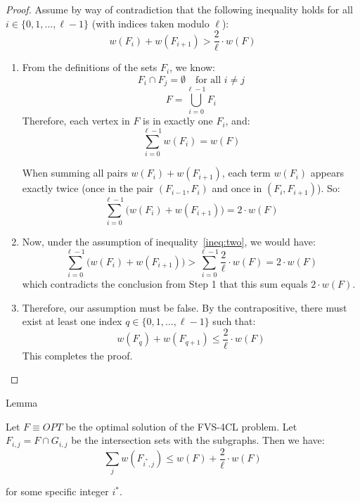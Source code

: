 \begin{proof}
Assume by way of contradiction that the following inequality holds for all \( i \in \{0, 1, \dots, \ell - 1\} \) (with indices taken modulo \( \ell \)):
\begin{equation}
    w(F_i) + w(F_{i+1}) > \frac{2}{\ell} \cdot w(F)
    \label{ineq:two}
\end{equation}

\begin{enumerate}
    \item From the definitions of the sets \( F_i \), we know:
    \[F_i \cap F_j = \emptyset \quad \text{for all } i \neq j\]
    \[F = \bigcup_{i = 0}^{\ell - 1} F_i\]
    Therefore, each vertex in \( F \) is in exactly one \( F_i \), and:
    \[
        \sum_{i=0}^{\ell - 1} w(F_i) = w(F)
    \]

    When summing all pairs \( w(F_i) + w(F_{i+1}) \), each term \( w(F_i) \) appears exactly twice (once in the pair \( (F_{i-1}, F_i) \) and once in \( (F_i, F_{i+1}) \)). So:
    \[
        \sum_{i=0}^{\ell - 1} \bigl( w(F_i) + w(F_{i+1}) \bigr) = 2 \cdot w(F)
    \]

    \item Now, under the assumption of inequality~\eqref{ineq:two}, we would have:
    \[
        \sum_{i=0}^{\ell - 1} \bigl( w(F_i) + w(F_{i+1}) \bigr) > \sum_{i=0}^{\ell - 1} \frac{2}{\ell} \cdot w(F) = 2 \cdot w(F)
    \]
    which contradicts the conclusion from Step 1 that this sum equals \( 2 \cdot w(F) \).

    \item Therefore, our assumption must be false. By the contrapositive, there must exist at least one index \( q \in \{0, 1, \dots, \ell - 1\} \) such that:
    \[
        w(F_q) + w(F_{q+1}) \leq \frac{2}{\ell} \cdot w(F)
    \]
    This completes the proof.
\end{enumerate}
\end{proof}

\begin{mydefinition}{Lemma}
    \label{lemma-bcisweighted_feedback_vertex_set_global}

    Let $F \equiv OPT$ be the optimal solution of the FVS-4CL problem.
    Let $F_{i, j} = F \cap G_{i, j}$ be the intersection 
    sets with the subgraphs. Then we have: 
    \[\sum\limits_{j} w(F_{i^{*}, j}) \leq w(F) + \frac{2}{\ell} \cdot w(F)\]

    for some specific integer $i^{*}$.

\end{mydefinition}

